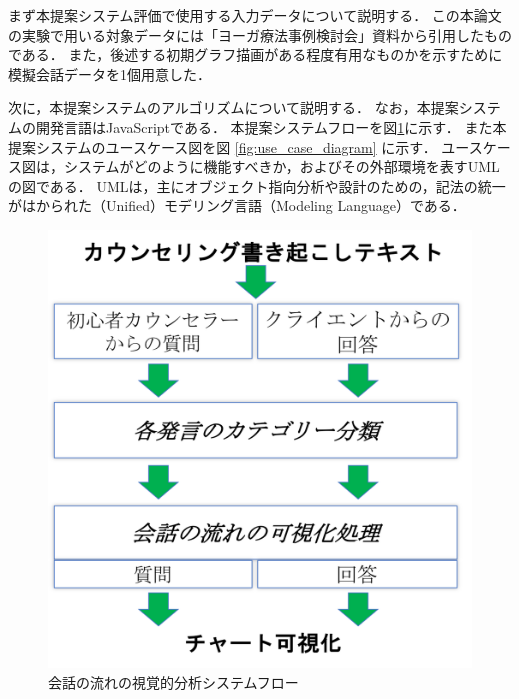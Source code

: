 \documentclass[shuuron]{kuee}
\begin{document}
まず本提案システム評価で使用する入力データについて説明する．
この本論文の実験で用いる対象データには「ヨーガ療法事例検討会」資料から引用したものである．
また，後述する初期グラフ描画がある程度有用なものかを示すために模擬会話データを1個用意した．

次に，本提案システムのアルゴリズムについて説明する．
なお，本提案システムの開発言語はJavaScriptである．
本提案システムフローを図\ref{fig:4_2}に示す．
また本提案システムのユースケース図を図
\ref{fig:use_case_diagram}
に示す．
ユースケース図は，システムがどのように機能すべきか，およびその外部環境を表すUMLの図である．
UMLは，主にオブジェクト指向分析や設計のための，記法の統一がはかられた（Unified）モデリング言語（Modeling Language）である．


\begin{figure}
  \begin{center}
    \includegraphics[width=\linewidth]{4_2.png}
  \end{center}
  \caption{会話の流れの視覚的分析システムフロー}
  \label{fig:4_2}
\end{figure}
\end{document}
